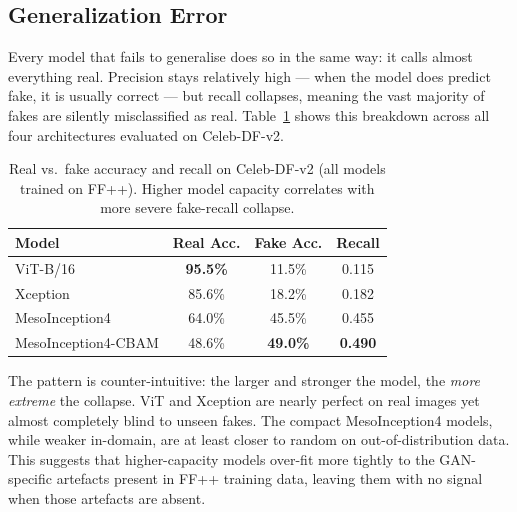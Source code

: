 \documentclass[conference]{IEEEtran}
\begin{document}
\subsection{Generalization Error}
Every model that fails to generalise does so in the same way: it calls almost everything real.
Precision stays relatively high --- when the model does predict fake, it is usually correct ---
but recall collapses, meaning the vast majority of fakes are silently misclassified as real.
Table~\ref{tab:gen_collapse} shows this breakdown across all four architectures evaluated on
Celeb-DF-v2.

\begin{table}[h]
\centering
\caption{Real vs.\ fake accuracy and recall on Celeb-DF-v2 (all models trained on FF++).
         Higher model capacity correlates with more severe fake-recall collapse.}
\label{tab:gen_collapse}
\begin{tabular}{lccc}
\toprule
\textbf{Model} & \textbf{Real Acc.} & \textbf{Fake Acc.} & \textbf{Recall} \\
\midrule
ViT-B/16            & \textbf{95.5\%} & 11.5\% & 0.115 \\
Xception            & 85.6\%          & 18.2\% & 0.182 \\
MesoInception4      & 64.0\%          & 45.5\% & 0.455 \\
MesoInception4-CBAM & 48.6\%          & \textbf{49.0\%} & \textbf{0.490} \\
\bottomrule
\end{tabular}
\end{table}

The pattern is counter-intuitive: the larger and stronger the model, the \emph{more extreme}
the collapse. ViT and Xception are nearly perfect on real images yet almost completely
blind to unseen fakes. The compact MesoInception4 models, while weaker in-domain, are at
least closer to random on out-of-distribution data. This suggests that higher-capacity
models over-fit more tightly to the GAN-specific artefacts present in FF++ training data,
leaving them with no signal when those artefacts are absent.
\end{document}
